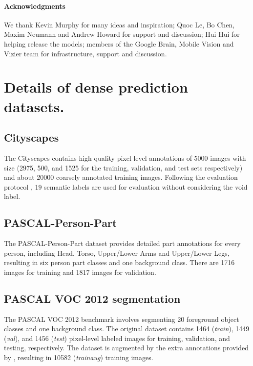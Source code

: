\documentclass{article}
\begin{document}
\paragraph{Acknowledgments}
We thank Kevin Murphy for many ideas and inspiration; Quoc Le, Bo Chen, Maxim Neumann and Andrew Howard for support and discussion; Hui Hui for helping release the models; members of the Google Brain, Mobile Vision and Vizier team for infrastructure, support and discussion.









 
{\small


}

\newpage
\appendix

\section{Details of dense prediction datasets.}

\subsection{Cityscapes}

The Cityscapes \cite{Cordts2016Cityscapes} contains high quality pixel-level annotations of 5000 images with size  (2975, 500, and 1525 for the training, validation, and test sets respectively) and about 20000 coarsely annotated training images. Following the evaluation protocol \cite{Cordts2016Cityscapes}, 19 semantic labels are used for evaluation without considering the void label.

\subsection{PASCAL-Person-Part}

The PASCAL-Person-Part dataset \cite{chen_cvpr14} provides detailed part annotations for every person, including Head, Torso, Upper/Lower Arms and Upper/Lower Legs, resulting in six person part classes and one background class. There are 1716 images for training and 1817 images for validation.

\subsection{PASCAL VOC 2012 segmentation}

The PASCAL VOC 2012 benchmark
\cite{everingham2014pascal} involves segmenting 20 foreground object classes and one background class.
The original dataset contains 1464 (\textit{train}), 1449 (\textit{val}), and 1456 (\textit{test}) pixel-level labeled images for training, validation, and testing, respectively. The dataset is augmented by the extra annotations provided by \cite{hariharan2011semantic}, resulting in 10582 (\textit{trainaug}) training images.
\end{document}
